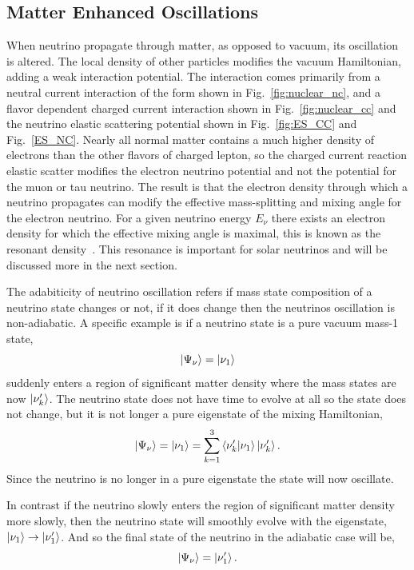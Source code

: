 \subsection{Matter Enhanced Oscillations}
When neutrino propagate through matter, as opposed to vacuum, its oscillation is altered.
The local density of other particles modifies the vacuum Hamiltonian,
adding a weak interaction potential.
The interaction comes primarily from a neutral current interaction of the form
shown in Fig.~\ref{fig:nuclear_nc}, and a flavor dependent charged current interaction shown in
Fig.~\ref{fig:nuclear_cc} and the  neutrino elastic scattering potential shown in
Fig.~\ref{fig:ES_CC} and Fig.~\ref{ES_NC}.
Nearly all normal matter contains a much higher density of electrons
than the other flavors of charged lepton, so the charged current reaction
elastic scatter modifies the electron neutrino potential and not the potential for the muon
or tau neutrino.
The result is that the electron density through which a neutrino propagates
can modify the effective mass-splitting and mixing angle for the electron
neutrino.
For a given neutrino energy $E_{\nu}$ there exists an electron density for which
the effective mixing angle is maximal, this is known as the resonant density~\cite{wolfenstein_osc, ms_oscillation}.
This resonance is important for solar neutrinos and will be discussed more in
the next section.

The adabiticity of neutrino oscillation refers if mass state composition
of a neutrino state changes or not, if it does change then the neutrinos
oscillation is non-adiabatic.
A specific example is if a neutrino state is a pure vacuum mass-1
state,
\begin{equation*}
    \ket{\Psi_{\nu}} = \ket{\nu_{1}}
\end{equation*}
suddenly enters a region of significant matter density where the mass states
are now $\ket{\nu_{k}^\prime}$.
The neutrino state does not have time to evolve at all so the state
does not change, but it is not longer a pure eigenstate of the mixing
Hamiltonian,
\begin{equation*}
    \ket{\Psi_{\nu}} = \ket{\nu_{1}} = \sum_{k=1}^{3} \braket{\nu_{k}^\prime}{\nu_{1}}\ket{\nu_{k}^\prime}\text{.}
\end{equation*}
Since the neutrino is no longer in a pure eigenstate the state will
now oscillate.

In contrast if the neutrino slowly enters the region of significant matter
density more slowly, then the neutrino state will smoothly evolve with the
eigenstate, $\ket{\nu_{1}} \rightarrow \ket{\nu_{1}^{\prime}}$.
And so the final state of the neutrino in the adiabatic case will be,
\begin{equation*}
    \ket{\Psi_{\nu}} = \ket{\nu_{1}^{\prime}}\text{.}
\end{equation*}

